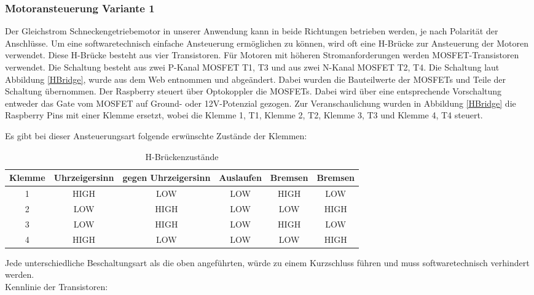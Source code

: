 \subsubsection{Motoransteuerung Variante 1}
Der Gleichstrom Schneckengetriebemotor in unserer Anwendung kann in beide Richtungen betrieben werden, je nach Polarität der Anschlüsse. Um eine softwaretechnisch einfache Ansteuerung ermöglichen zu können, wird oft eine H-Brücke zur Ansteuerung der Motoren verwendet. Diese H-Brücke besteht aus vier Transistoren. Für Motoren mit höheren Stromanforderungen werden MOSFET-Transistoren verwendet. Die Schaltung besteht aus zwei P-Kanal MOSFET T1, T3 und aus zwei N-Kanal MOSFET T2, T4. Die Schaltung laut Abbildung \ref{HBridge}, wurde aus dem Web entnommen und abgeändert. Dabei wurden die Bauteilwerte der MOSFETs und Teile der Schaltung übernommen. Der Raspberry steuert über Optokoppler die MOSFETs. Dabei wird über eine entsprechende Vorschaltung entweder das Gate vom MOSFET auf Ground- oder 12V-Potenzial gezogen. Zur Veranschaulichung wurden in Abbildung \ref{HBridge} die Raspberry Pins mit einer Klemme ersetzt, wobei die Klemme 1, T1, Klemme 2, T2, Klemme 3, T3 und Klemme 4, T4 steuert. 

Es gibt bei dieser Ansteuerungsart folgende erwünschte Zustände der Klemmen: \\
\begin{table}[htb]
\centering
\begin{tabular}{|c|c|c|c|c|c|} \hline
Klemme & Uhrzeigersinn & gegen Uhrzeigersinn & Auslaufen & Bremsen & Bremsen \\ \hline
1 & HIGH & LOW & LOW & HIGH & LOW  \\ \hline
2 & LOW & HIGH & LOW & LOW & HIGH \\ \hline
3 & LOW & HIGH & LOW & HIGH & LOW \\ \hline
4 & HIGH & LOW & LOW & LOW & HIGH \\ \hline
\end{tabular}
\caption{H-Brückenzustände}
\label{HBridge states}
\end{table}

Jede unterschiedliche Beschaltungsart als die oben angeführten, würde zu einem Kurzschluss führen und muss softwaretechnisch verhindert werden. \\


Kennlinie der Transistoren:

